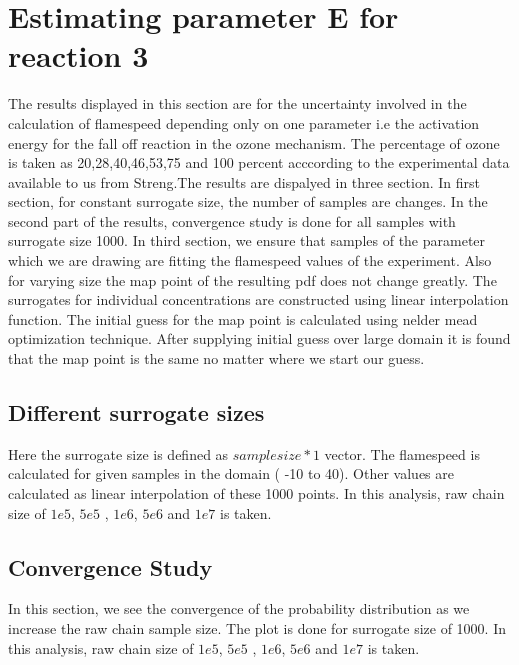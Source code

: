 
\section{Estimating parameter E for reaction 3 }

The results displayed in this section are for the uncertainty involved in the calculation of flamespeed depending only on one parameter i.e the activation energy for the fall off reaction in the ozone mechanism. The percentage of ozone is taken as 20,28,40,46,53,75 and 100  percent acccording to the experimental data available to us from Streng\cite{Streng}.The results are dispalyed in three section. In first section, for constant surrogate size, the number of samples are changes. In the second part of the results, convergence study is done for all samples with surrogate size 1000. In third section, we ensure that samples of the parameter which we are drawing are fitting the flamespeed values of the experiment. Also for varying size the map point of the resulting pdf does not change greatly. The surrogates for individual concentrations are constructed using linear interpolation function. The initial guess for the map point is calculated using nelder mead optimization technique. After supplying initial guess over large domain it is found that the map point is the same no matter where we start our guess. 
\bigskip

\subsection{Different surrogate sizes }

\noindent Here the surrogate size is defined as $sample size*1$ vector. The flamespeed is calculated for given samples in the domain ( -10 to 40). Other values are calculated as linear interpolation of these 1000 points. In this analysis, raw chain size of $1e5$, $5e5$ , $1e6$, $5e6$ and $1e7$ is taken. 






\subsection{Convergence Study }

\noindent In this section, we see the convergence of the probability distribution as we increase the raw chain sample size. The plot is done for surrogate size of 1000. In this analysis, raw chain size of $1e5$, $5e5$ , $1e6$, $5e6$ and $1e7$ is taken. 

